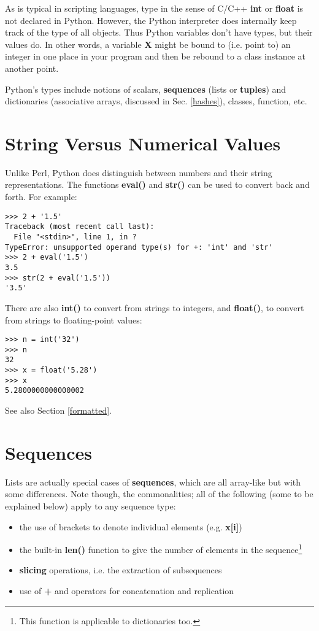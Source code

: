 As is typical in scripting languages, type in the sense of C/C++ {\bf
int} or {\bf float} is not declared in Python.  However, the Python
interpreter does internally keep track of the type of all objects.  Thus
Python variables don't have types, but their values do.  In other words,
a variable {\bf X} might be bound to (i.e. point to) an integer in one
place in your program and then be rebound to a class instance at another
point.

Python's types include notions of scalars, {\bf sequences} (lists or
{\bf tuples}) and dictionaries (associative arrays, discussed in Sec.
\ref{hashes}), classes, function, etc. 

\section{String Versus Numerical Values}

Unlike Perl, Python does distinguish between numbers and their string
representations.  The functions {\bf eval()} and {\bf str()} can be used
to convert back and forth.  For example:

\begin{Verbatim}[fontsize=\relsize{-2}]
>>> 2 + '1.5'
Traceback (most recent call last):
  File "<stdin>", line 1, in ?
TypeError: unsupported operand type(s) for +: 'int' and 'str'
>>> 2 + eval('1.5')
3.5
>>> str(2 + eval('1.5'))
'3.5'
\end{Verbatim}

There are also {\bf int()} to convert from strings to integers, and {\bf
float()}, to convert from strings to floating-point values:

\begin{Verbatim}[fontsize=\relsize{-2}]
>>> n = int('32')
>>> n
32
>>> x = float('5.28')
>>> x
5.2800000000000002
\end{Verbatim} 

See also Section \ref{formatted}. 

\section{Sequences}

Lists are actually special cases of {\bf sequences}, which are all
array-like but with some differences.  Note though, the commonalities;
all of the following (some to be explained below) apply to any sequence
type:

\begin{itemize}

\item the use of brackets to denote individual elements (e.g. {\bf
x[i]})

\item the built-in {\bf len()} function to give the number of elements
in the sequence\footnote{This function is applicable to dictionaries
too.}

\item {\bf slicing} operations, i.e. the extraction of subsequences 

\item use of {\bf +} and {\bf *} operators for concatenation and
replication

\end{itemize}

